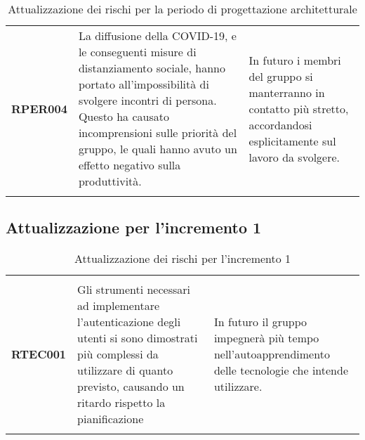 \documentclass[../piano-di-progetto]{subfiles}
\begin{document}
\begin{longtable}[H]{|p{10em}|p{17em}|p{17em}|}
  \textbf{RPER004}                & La diffusione della COVID-19, e le conseguenti misure di distanziamento sociale, hanno portato all'impossibilità di svolgere incontri di persona. Questo ha causato incomprensioni sulle priorità del gruppo, le quali hanno avuto un effetto negativo sulla produttività.                                                                                                                                                                  & In futuro i membri del gruppo si manterranno in contatto più stretto, accordandosi esplicitamente sul lavoro da svolgere.                                                                                                                                                                                                                                                                                         \\
  \rowcolor{white}
  \caption{Attualizzazione dei rischi per la periodo di progettazione architetturale}%
  \label{tab:attualizzazione_per_la_periodo_di_progettazione_architetturale}
\end{longtable}

\subsection{Attualizzazione per l'incremento 1}%
\label{sub:attualizzazione_per_incremento_1}

\begin{longtable}[H]{|p{10em}|p{17em}|p{17em}|}
  \rowcolor{darkgray!90!}
  \color{white}{\textbf{Rischio}} & \color{white}{\textbf{Gestione}}                                                                                                                                                        & \color{white}{\textbf{Monitoraggio}}                                                       \\
  \textbf{RTEC001}                & Gli strumenti necessari ad implementare l'autenticazione degli utenti si sono dimostrati più complessi da utilizzare di quanto previsto, causando un ritardo rispetto la pianificazione & In futuro il gruppo impegnerà più tempo nell'autoapprendimento delle tecnologie che intende utilizzare. \\
  \rowcolor{white}
  \caption{Attualizzazione dei rischi per l'incremento 1}%
  \label{tab:attualizzazione_per_incremento_1}
\end{longtable}
\end{document}

